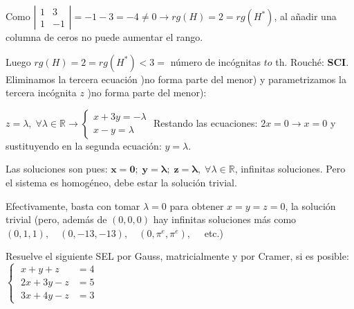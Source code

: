 \begin{proofw}
Como $\left| \begin{matrix} 1&3\\1&-1 \end{matrix} \right|=-1-3=-4\neq 0 \to rg(H)=2=rg(H^*) $, al añadir una columna de ceros no puede aumentar el rango.

Luego $rg(H)=2=rg(H^*)<3=$ número de incógnitas $to$ th. Rouché: \textbf{SCI}. Eliminamos la tercera ecuación )no forma parte del menor) y parametrizamos la tercera incógnita $z$ )no forma parte del menor):

$z=\lambda, \; \forall \lambda \in \mathbb R \to \begin{cases} x+3y=-\lambda\\x-y=\lambda \end{cases}$ Restando las ecuaciones: $2x=0\to x=0$ y sustituyendo en la segunda ecuación: $y=\lambda$.

Las soluciones son pues: $\boldsymbol{x=0; \; y=\lambda; \; z=\lambda}, \; \forall \lambda \in \mathbb R$, infinitas soluciones. Pero el sistema es homogéneo, debe estar la solución trivial.

Efectivamente, basta con tomar $\lambda=0$ para obtener $x=y=z=0$, la solución trivial \textcolor{gris}{(pero, además de $(0,0,0)$ hay infinitas soluciones más como $(0,1,1), \quad (0,-13,-13), \quad (0,\pi^e, \pi^e), \quad$ etc.)}
	
\end{proofw}


\begin{ejre}
	Resuelve el siguiente SEL por Gauss, matricialmente y por Cramer, si es posible:
	$\begin{cases} \; x+y+z&=4 \\\; 2x+3y-z&=5\\ \; 3x+4y-z&=3    \end{cases}$

\end{ejre}



